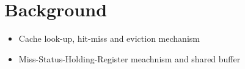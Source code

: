 \section{Background}
    \begin{itemize}
        \item Cache look-up, hit-miss and eviction mechanism
        \item Miss-Status-Holding-Register meachnism and shared buffer
    \end{itemize}
